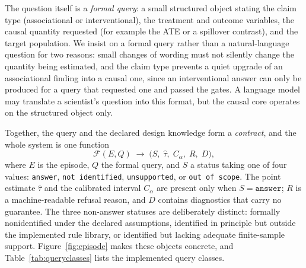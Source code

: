 \documentclass[electronics,article,submit,oneauthor]{Definitions/mdpi}
\begin{document}
The question itself is a \emph{formal query}: a small structured object stating the claim type (associational or interventional), the treatment and outcome variables, the causal quantity requested (for example the ATE or a spillover contrast), and the target population. We insist on a formal query rather than a natural-language question for two reasons: small changes of wording must not silently change the quantity being estimated, and the claim type prevents a quiet upgrade of an associational finding into a causal one, since an interventional answer can only be produced for a query that requested one and passed the gates. A language model may translate a scientist's question into this format, but the causal core operates on the structured object only.

Together, the query and the declared design knowledge form a \emph{contract}, and the whole system is one function
\begin{equation}
\mathcal{F}(E, Q) \;\rightarrow\; \bigl(S,\; \widehat{\tau},\; C_\alpha,\; R,\; D\bigr),
\end{equation}
where $E$ is the episode, $Q$ the formal query, and $S$ a status taking one of four values: \texttt{answer}, \texttt{not identified}, \texttt{unsupported}, or \texttt{out of scope}. The point estimate $\widehat{\tau}$ and the calibrated interval $C_\alpha$ are present only when $S = \texttt{answer}$; $R$ is a machine-readable refusal reason, and $D$ contains diagnostics that carry no guarantee. The three non-answer statuses are deliberately distinct: formally nonidentified under the declared assumptions, identified in principle but outside the implemented rule library, or identified but lacking adequate finite-sample support. Figure~\ref{fig:episode} makes these objects concrete, and Table~\ref{tab:queryclasses} lists the implemented query classes.
\end{document}
